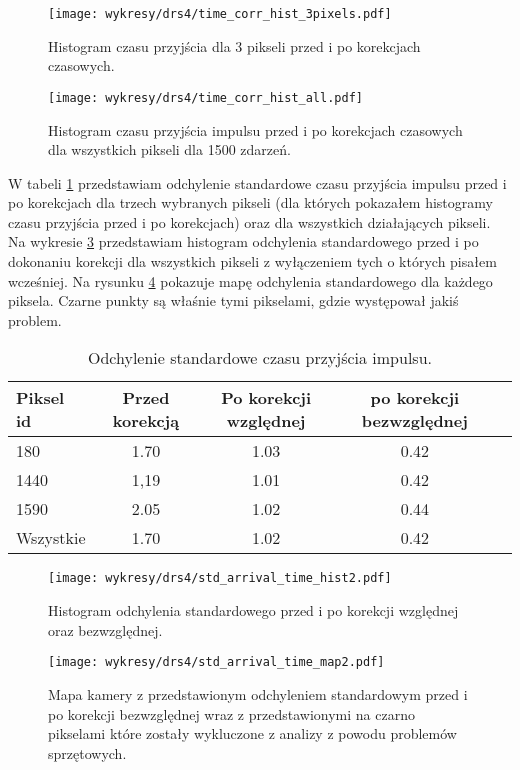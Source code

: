 \documentclass[a4paper,11pt,twoside]{article}
\begin{document}
\begin{figure}[H] 
\centering
\texttt{[image: wykresy/drs4/time\_corr\_hist\_3pixels.pdf]}
\caption{Histogram czasu przyjścia dla 3 pikseli przed i po korekcjach czasowych.}
\label{fig:time_corr_hist3}
\end{figure}
\begin{figure}[H] 
\centering
\texttt{[image: wykresy/drs4/time\_corr\_hist\_all.pdf]}
\caption{Histogram czasu przyjścia impulsu przed i po korekcjach czasowych dla wszystkich pikseli dla 1500 zdarzeń.}
\label{fig:time_corr_hist_all}
\end{figure}
W tabeli \ref{tab:std} przedstawiam odchylenie standardowe czasu przyjścia impulsu przed i po korekcjach dla trzech wybranych pikseli (dla których pokazałem histogramy czasu przyjścia przed i po korekcjach) oraz dla wszystkich działających pikseli. Na wykresie \ref{fig:std_hist_time_corr} przedstawiam histogram odchylenia standardowego przed i po dokonaniu korekcji dla wszystkich pikseli z wyłączeniem tych o których pisałem wcześniej. Na rysunku \ref{fig:std_map_time_corr} pokazuje mapę odchylenia standardowego dla każdego piksela. Czarne punkty są właśnie tymi pikselami, gdzie występował jakiś problem.
\begin{table}[H]
\caption{Odchylenie standardowe czasu przyjścia impulsu.}
\begin{tabular}{|l|c|c|c|l|}
\hline
Piksel id & Przed korekcją  & Po korekcji względnej  & po korekcji bezwzględnej   \\ \hline
180  & 1.70  & 1.03  & 0.42    \\ \hline
1440 & 1,19  & 1.01  & 0.42    \\  \hline
1590 & 2.05  & 1.02  & 0.44    \\  \hline
Wszystkie & 1.70  & 1.02 & 0.42   \\  \hline
\end{tabular}
\label{tab:std}
\end{table}

\begin{figure}[H] 
\centering
\texttt{[image: wykresy/drs4/std\_arrival\_time\_hist2.pdf]}
\caption{Histogram odchylenia standardowego przed i po korekcji względnej oraz bezwzględnej.}
\label{fig:std_hist_time_corr}
\end{figure}

\begin{figure}[H] 
\centering
\texttt{[image: wykresy/drs4/std\_arrival\_time\_map2.pdf]}
\caption{Mapa kamery z przedstawionym odchyleniem standardowym przed i po korekcji bezwzględnej wraz z przedstawionymi na czarno pikselami które zostały wykluczone z analizy z powodu problemów sprzętowych.}
\label{fig:std_map_time_corr}
\end{figure}
\newpage
\end{document}
